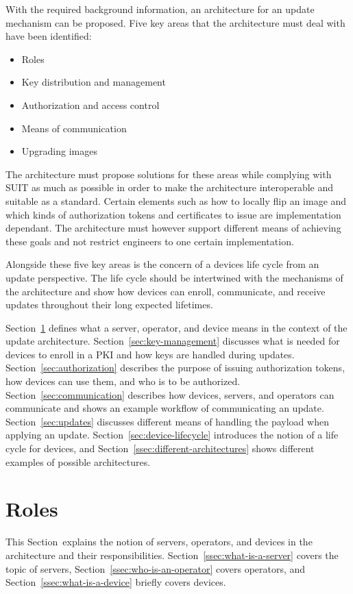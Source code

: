 \documentclass[0-thesis.tex]{subfiles}
\begin{document}
With the required background information, an architecture for an update mechanism can be
proposed. Five key areas that the architecture must deal with have been identified:

\begin{itemize}
    \item Roles
    \item Key distribution and management
    \item Authorization and access control
    \item Means of communication
    \item Upgrading images
\end{itemize}

The architecture must propose solutions for these areas while complying with SUIT as much
as possible in order to make the architecture interoperable and suitable as a standard.
Certain elements such as how to locally flip an image and which kinds of authorization
tokens and certificates to issue are implementation dependant. The architecture must
however support different means of achieving these goals and not restrict engineers to one
certain implementation.

Alongside these five key areas is the concern of a devices life cycle from an update
perspective. The life cycle should be intertwined with the mechanisms of the architecture
and show how devices can enroll, communicate, and receive updates throughout their long
expected lifetimes. 

Section~\ref{sec:roles} defines what a server, operator, and device means in the context
of the update architecture. Section~\ref{sec:key-management} discusses what is needed for
devices to enroll in a PKI and how keys are handled during updates.
Section~\ref{sec:authorization} describes the purpose of issuing authorization tokens, how
devices can use them, and who is to be authorized. Section~\ref{sec:communication}
describes how devices, servers, and operators can communicate and shows an example
workflow of communicating an update. Section~\ref{sec:updates} discusses different means
of handling the payload when applying an update. Section~\ref{sec:device-lifecycle}
introduces the notion of a life cycle for devices, and
Section~\ref{ssec:different-architectures} shows different examples of possible
architectures.

\section{Roles}
\label{sec:roles}
This Section~explains the notion of servers, operators, and devices in the architecture
and their responsibilities. Section~\ref{ssec:what-is-a-server} covers the topic of
servers, Section~\ref{ssec:who-is-an-operator} covers operators, and
Section~\ref{ssec:what-is-a-device} briefly covers devices.
\end{document}
